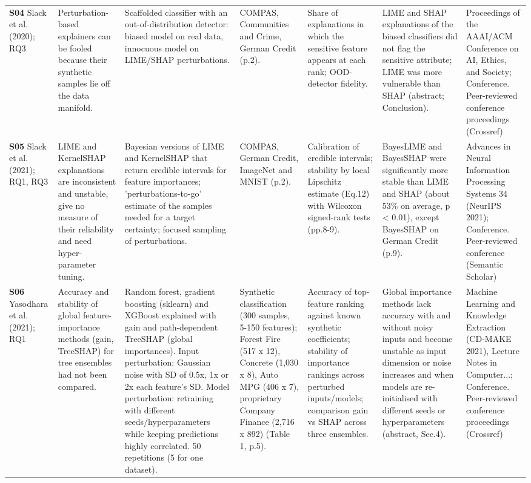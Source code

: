 \begin{longtable}{@{}P{1.55cm}P{2.9cm}P{4.5cm}P{3.2cm}P{3.4cm}P{4.6cm}P{3.6cm}@{}}
\textbf{S04} \cite{S04} Slack et al. (2020); RQ3 & Perturbation-based explainers can be fooled because their synthetic samples lie off the data manifold. & Scaffolded classifier with an out-of-distribution detector: biased model on real data, innocuous model on LIME/\allowbreak{}SHAP perturbations. & COMPAS, Communities and Crime, German Credit (p.2). & Share of explanations in which the sensitive feature appears at each rank; OOD-detector fidelity. & LIME and SHAP explanations of the biased classifiers did not flag the sensitive attribute; LIME was more vulnerable than SHAP (abstract; Conclusion). & Proceedings of the AAAI/\allowbreak{}ACM Conference on AI, Ethics, and Society; Conference. Peer-reviewed conference proceedings (Crossref) \\
\textbf{S05} \cite{S05} Slack et al. (2021); RQ1, RQ3 & LIME and KernelSHAP explanations are inconsistent and unstable, give no measure of their reliability and need hyper-parameter tuning. & Bayesian versions of LIME and KernelSHAP that return credible intervals for feature importances; 'perturbations-to-go' estimate of the samples needed for a target certainty; focused sampling of perturbations. & COMPAS, German Credit, ImageNet and MNIST (p.2). & Calibration of credible intervals; stability by local Lipschitz estimate (Eq.12) with Wilcoxon signed-rank tests (pp.8-9). & BayesLIME and BayesSHAP were significantly more stable than LIME and SHAP (about 53\% on average, p \textless{} 0.01), except BayesSHAP on German Credit (p.9). & Advances in Neural Information Processing Systems 34 (NeurIPS 2021); Conference. Peer-reviewed conference (Semantic Scholar) \\
\textbf{S06} \cite{S06} Yasodhara et al. (2021); RQ1 & Accuracy and stability of global feature-importance methods (gain, TreeSHAP) for tree ensembles had not been compared. & Random forest, gradient boosting (sklearn) and XGBoost explained with gain and path-dependent TreeSHAP (global importances). Input perturbation: Gaussian noise with SD of 0.5x, 1x or 2x each feature's SD. Model perturbation: retraining with different seeds/\allowbreak{}hyperparameters while keeping predictions highly correlated. 50 repetitions (5 for one dataset). & Synthetic classification (300 samples, 5-150 features); Forest Fire (517 x 12), Concrete (1,030 x 8), Auto MPG (406 x 7), proprietary Company Finance (2,716 x 892) (Table 1, p.5). & Accuracy of top-feature ranking against known synthetic coefficients; stability of importance rankings across perturbed inputs/\allowbreak{}models; comparison gain vs SHAP across three ensembles. & Global importance methods lack accuracy with and without noisy inputs and become unstable as input dimension or noise increases and when models are re-initialised with different seeds or hyperparameters (abstract, Sec.4). & Machine Learning and Knowledge Extraction (CD-MAKE 2021), Lecture Notes in Computer...; Conference. Peer-reviewed conference proceedings (Crossref) \\

\end{longtable}
